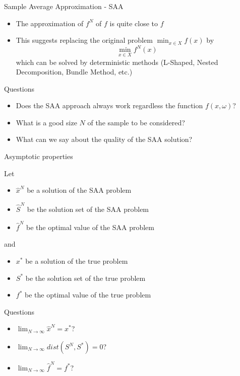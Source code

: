 \begin{frame}{Sample Average Approximation - SAA}

\begin{itemize}

\item The approximation of $f^N$ of $f$ is quite close to $ f $
\pula

\item This suggests replacing the original problem $ \min_{x \in X} f (x) $ by
\[
\min_{x \in X} f^N (x) 
\]
which can be solved by deterministic methods (L-Shaped, Nested Decomposition, Bundle Method, etc.)
\end{itemize}
\begin{block}{Questions}
\begin{itemize}
\item Does the SAA approach always work regardless the function $f(x,\omega)$?
\pula

\item What is a good size $N$ of the sample to be considered?
\pula

\item What can we say about the quality of the SAA solution?
\end{itemize}
\end{block}

 \end{frame} 
 
 
 

\begin{frame}{Asymptotic properties}

Let 
\begin{itemize}
\item $\hat x^N$ be a solution of the SAA problem
\item $\hat S^N$ be the solution set of the SAA problem
\item $\hat f^N$ be the optimal value of the SAA problem
\end{itemize}
and
\begin{itemize}
\item $ x^*$ be a solution of the true problem
\item $S^*$ be the solution set of the true problem
\item $f^*$ be the optimal value of the true problem
\end{itemize}


\begin{block}{Questions}
\begin{itemize}
\item $\lim_{N\to \infty} \hat x^N = x^*$?
\pula 
\item $\lim_{N\to \infty} dist(S^N,S^*) = 0$?
\pula
\item $\lim_{N\to \infty} \hat f^N = f^*$?

\end{itemize}
\end{block}
 \end{frame} 
 
